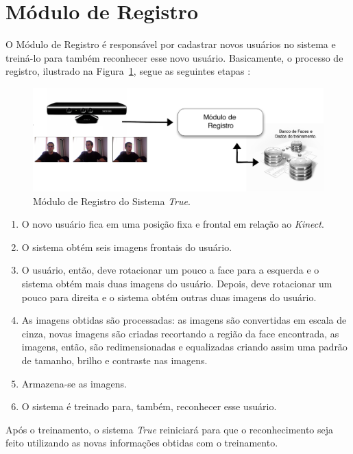 \section{Módulo de Registro}

	O Módulo de Registro é responsável por cadastrar novos usuários no sistema e treiná-lo para também reconhecer esse novo usuário. Basicamente, o processo de registro, ilustrado na Figura~\ref{fig:registro}, segue as seguintes etapas :

		\begin{figure}[H]
			\begin{center}
				\includegraphics[scale=1.5]{figuras/4.ProblemaEProposta/registro.png}
			\end{center}
			\caption{Módulo de Registro do Sistema \textit{True}.}
			\label{fig:registro}
		\end{figure}		

		\begin{enumerate}
			\item O novo usuário fica em uma posição fixa e frontal em relação ao \textit{Kinect}. 
			\item O sistema obtém seis imagens frontais do usuário.
			\item O usuário, então, deve rotacionar um pouco a face para a esquerda e o sistema obtém mais duas imagens do usuário. Depois, deve rotacionar um pouco para direita e o sistema obtém outras duas imagens do usuário.
			\item As imagens obtidas são processadas: as imagens são convertidas em escala de cinza, novas imagens são criadas recortando a região da face encontrada, as imagens, então, são redimensionadas e equalizadas criando assim uma padrão de tamanho, brilho e contraste nas imagens.
			\item Armazena-se as imagens.
			\item O sistema é treinado para, também, reconhecer esse usuário.
		\end{enumerate}

	Após o treinamento, o sistema \textit{True} reiniciará para que o reconhecimento seja feito utilizando as novas informações obtidas com o treinamento.

